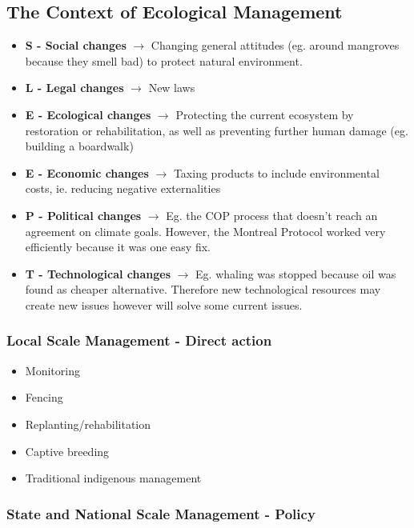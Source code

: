	\subsection{The Context of Ecological Management}
	
		\begin{itemize}
			\item \textbf{S - Social changes} $\rightarrow$ Changing general attitudes (eg. around mangroves because they smell bad) to protect natural environment. 
			\item \textbf{L - Legal changes} $\rightarrow$ New laws
			\item \textbf{E - Ecological changes} $\rightarrow$ Protecting the current ecosystem by restoration or rehabilitation, as well as preventing further human damage (eg. building a boardwalk)
			\item \textbf{E - Economic changes} $\rightarrow$ Taxing products to include environmental costs, ie. reducing negative externalities
			\item \textbf{P - Political changes} $\rightarrow$ Eg. the COP process that doesn't reach an agreement on climate goals. However, the Montreal Protocol worked very efficiently because it was one easy fix.
			\item \textbf{T - Technological changes} $\rightarrow$ Eg. whaling was stopped because oil was found as cheaper alternative. Therefore new technological resources may create new issues however will solve some current issues.
		\end{itemize}

	
		\subsubsection{Local Scale Management - Direct action}

			\begin{itemize}
				\item Monitoring
				\item Fencing
				\item Replanting/rehabilitation
				\item Captive breeding
				\item Traditional indigenous management
			\end{itemize}

		\subsubsection{State and National Scale Management - Policy}
		
